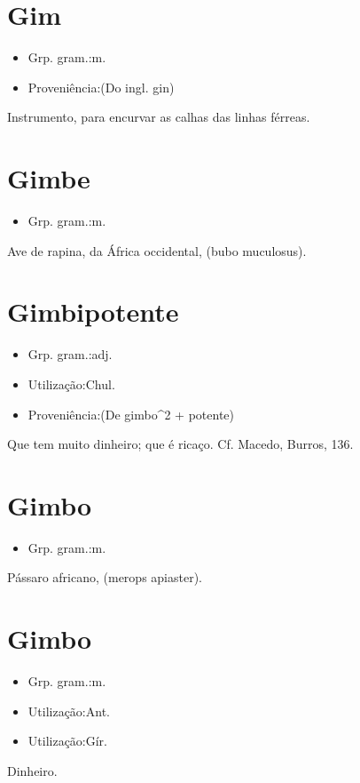 \section{Gim}
\begin{itemize}
\item {Grp. gram.:m.}
\end{itemize}
\begin{itemize}
\item {Proveniência:(Do ingl. \textunderscore gin\textunderscore )}
\end{itemize}
Instrumento, para encurvar as calhas das linhas férreas.
\section{Gimbe}
\begin{itemize}
\item {Grp. gram.:m.}
\end{itemize}
Ave de rapina, da África occidental, (\textunderscore bubo muculosus\textunderscore ).
\section{Gimbipotente}
\begin{itemize}
\item {Grp. gram.:adj.}
\end{itemize}
\begin{itemize}
\item {Utilização:Chul.}
\end{itemize}
\begin{itemize}
\item {Proveniência:(De \textunderscore gimbo\textunderscore ^2 + \textunderscore potente\textunderscore )}
\end{itemize}
Que tem muito dinheiro; que é ricaço. Cf. Macedo, \textunderscore Burros\textunderscore , 136.
\section{Gimbo}
\begin{itemize}
\item {Grp. gram.:m.}
\end{itemize}
Pássaro africano, (\textunderscore merops apiaster\textunderscore ).
\section{Gimbo}
\begin{itemize}
\item {Grp. gram.:m.}
\end{itemize}
\begin{itemize}
\item {Utilização:Ant.}
\end{itemize}
\begin{itemize}
\item {Utilização:Gír.}
\end{itemize}
Dinheiro.
